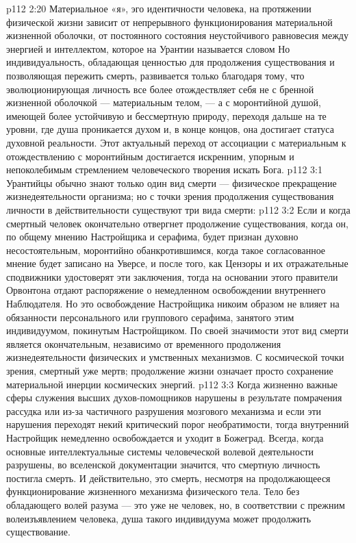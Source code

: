 \vs p112 2:20 \pc Материальное «я», эго идентичности человека, на протяжении физической жизни зависит от непрерывного функционирования материальной жизненной оболочки, от постоянного состояния неустойчивого равновесия между энергией и интеллектом, которое на Урантии называется словом  Но индивидуальность, обладающая ценностью для продолжения существования и позволяющая пережить смерть, развивается только благодаря тому, что эволюционирующая личность все более отождествляет себя не с бренной жизненной оболочкой --- материальным телом, --- а с моронтийной душой, имеющей более устойчивую и бессмертную природу, переходя дальше на те уровни, где душа проникается духом и, в конце концов, она достигает статуса духовной реальности. Этот актуальный переход от ассоциации с материальным к отождествлению с моронтийным достигается искренним, упорным и непоколебимым стремлением человеческого творения искать Бога.
\vs p112 3:1 Урантийцы обычно знают только один вид смерти --- физическое прекращение жизнедеятельности организма; но с точки зрения продолжения существования личности в действительности существуют три вида смерти:
\vs p112 3:2 \bibnobreakspace {} Если и когда смертный человек окончательно отвергнет продолжение существования, когда он, по общему мнению Настройщика и серафима, будет признан духовно несостоятельным, моронтийно обанкротившимся, когда такое согласованное мнение будет записано на Уверсе, и после того, как Цензоры и их отражательные сподвижники удостоверят эти заключения, тогда на основании этого правители Орвонтона отдают распоряжение о немедленном освобождении внутреннего Наблюдателя. Но это освобождение Настройщика никоим образом не влияет на обязанности персонального или группового серафима, занятого этим индивидуумом, покинутым Настройщиком. По своей значимости этот вид смерти является окончательным, независимо от временного продолжения жизнедеятельности физических и умственных механизмов. С космической точки зрения, смертный уже мертв; продолжение жизни означает просто сохранение материальной инерции космических энергий.
\vs p112 3:3 \bibnobreakspace {} Когда жизненно важные сферы служения высших духов\hyp{}помощников нарушены в результате помрачения рассудка или из\hyp{}за частичного разрушения мозгового механизма и если эти нарушения переходят некий критический порог необратимости, тогда внутренний Настройщик немедленно освобождается и уходит в Божеград. Всегда, когда основные интеллектуальные системы человеческой волевой деятельности разрушены, во вселенской документации значится, что смертную личность постигла смерть. И действительно, это смерть, несмотря на продолжающееся функционирование жизненного механизма физического тела. Тело без обладающего волей разума --- это уже не человек, но, в соответствии с прежним волеизъявлением человека, душа такого индивидуума может продолжить существование.
